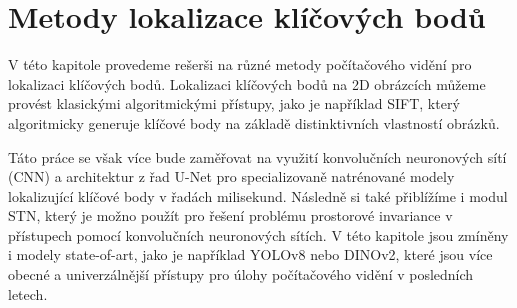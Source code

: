\chapter{Metody lokalizace klíčových bodů}
\label{sec:Chapter2}
V této kapitole provedeme rešerši na různé metody počítačového vidění pro lokalizaci klíčových bodů. Lokalizaci klíčových bodů na 2D obrázcích můžeme provést klasickými algoritmickými přístupy, jako je například SIFT, který algoritmicky generuje klíčové body na základě distinktivních vlastností obrázků. 

Táto práce se však více bude zaměřovat na využití konvolučních neuronových sítí (CNN) a architektur z řad U-Net pro specializovaně natrénované modely lokalizující klíčové body v řadách milisekund. Následně si také přiblížíme i modul STN, který je možno použít pro řešení problému prostorové invariance v přístupech pomocí konvolučních neuronových sítích. V této kapitole jsou zmíněny i modely state-of-art, jako je například YOLOv8 nebo DINOv2, které jsou více obecné a univerzálnější přístupy pro úlohy počítačového vidění v posledních letech.
\endinput